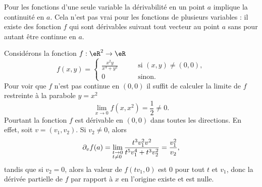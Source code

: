 Pour les fonctions d'une seule variable la dérivabilité en un point $a$ implique la continuité en $a$. Cela n'est pas vrai pour les fonctions de plusieurs variables : il existe des fonction $f$  qui sont dérivables suivant tout vecteur au point $a$ sans pour autant être continue en $a$. 

  \begin{example}
    Considérons la fonction $f:\eR^2\to \eR$ 
    \begin{equation}
      f(x,y)=\left\{
      \begin{array}{ll}
        \frac{x^2y}{x^4+y^2} \qquad&\textrm{si } (x,y)\neq (0,0),\\
        0     & \textrm{sinon}.
      \end{array}
      \right.
    \end{equation}
Pour voir que $f$ n'est pas continue en $(0,0)$ il suffit de calculer la limite de $f$ restreinte à la parabole $y=x^2$
\[
\lim_{x\to 0} f(x,x^2)=\frac{1}{2} \neq 0.
\] 
Pourtant la fonction $f$ est dérivable en $(0,0)$ dans toutes les directions. En effet, soit $v=(v_1,v_2)$. Si $v_2\neq 0$, alors
\[
\partial_v f(a)=\lim_{\begin{subarray}{l}
			t\to 0\\ t\neq 0 
  		\end{subarray}}
  		\frac{t^3v_1^2v^2}{t^5 v_1^4+ t^3v_2^2}=\frac{v_1^2}{v_2},
\] 
tandis que si $v_2=0$, alors la valeur de $f(tv_1, 0)$  est $0$ pour tout $t$ et $v_1$, donc la dérivée partielle de $f$ par rapport à $x$ en l'origine existe et est nulle. 
\end{example}

